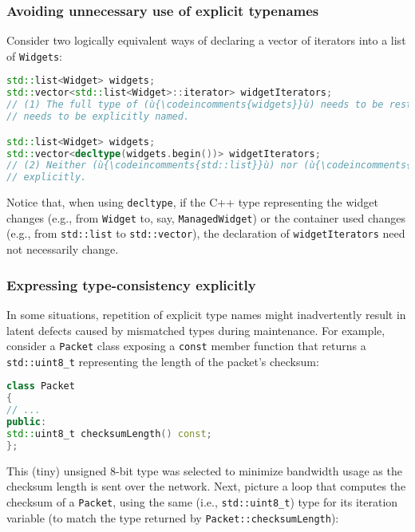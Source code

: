\subsubsection[Avoiding unnecessary use of explicit typenames]{Avoiding unnecessary use of explicit typenames}\label{avoiding-unnecessary-use-of-explicit-typenames}

Consider two logically equivalent ways of declaring a vector of
iterators into a list of \texttt{Widgets}:

\begin{lstlisting}[language=C++]
std::list<Widget> widgets;
std::vector<std::list<Widget>::iterator> widgetIterators;
// (1) The full type of (ù{\codeincomments{widgets}}ù) needs to be restated, and (ù{\codeincomments{iterator}}ù)
// needs to be explicitly named.

std::list<Widget> widgets;
std::vector<decltype(widgets.begin())> widgetIterators;
// (2) Neither (ù{\codeincomments{std::list}}ù) nor (ù{\codeincomments{Widget}}ù) nor (ù{\codeincomments{iterator}}ù) need be named
// explicitly.
\end{lstlisting}

\noindent Notice that, when using \texttt{decltype}, if the C++ type representing
the widget changes (e.g., from \texttt{Widget} to, say,
\texttt{ManagedWidget}) or the container used changes (e.g., from
\texttt{std::list} to \texttt{std::vector}), the declaration of
\texttt{widgetIterators} need not necessarily change.

\subsubsection[Expressing type-consistency explicitly]{Expressing type-consistency explicitly}\label{expressing-type-consistency-explicitly}

In some situations, repetition of explicit type names might
inadvertently result in latent defects caused by mismatched types during
maintenance. For example, consider a \texttt{Packet} class exposing a
\texttt{const} member function that returns a \texttt{std::uint8\_t}
representing the length of the packet's checksum:

\begin{lstlisting}[language=C++]
class Packet
{
// ...
public:
std::uint8_t checksumLength() const;
};
\end{lstlisting}

\noindent This (tiny) unsigned 8-bit type was selected to minimize bandwidth usage
as the checksum length is sent over the network. Next, picture a loop
that computes the checksum of a \texttt{Packet}, using the same (i.e.,
\texttt{std::uint8\_t}) type for its iteration variable (to match the
type returned by \texttt{Packet::checksumLength}):

